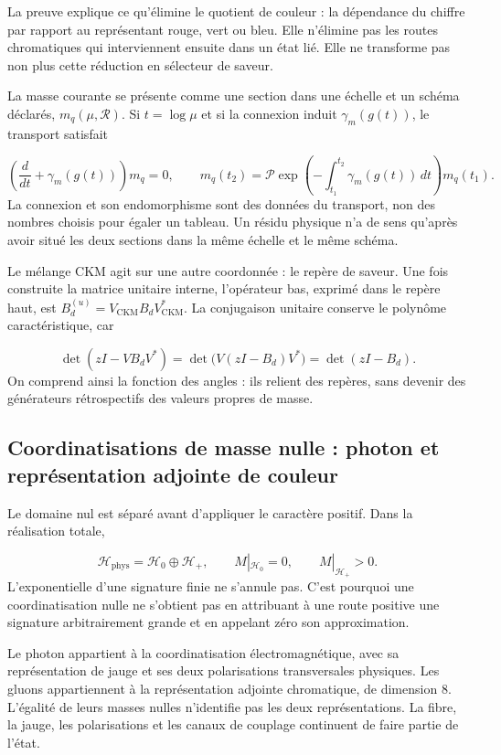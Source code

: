 La preuve explique ce qu’élimine le quotient de couleur : la dépendance du
chiffre par rapport au représentant rouge, vert ou bleu. Elle n’élimine pas les
routes chromatiques qui interviennent ensuite dans un état lié. Elle ne
transforme pas non plus cette réduction en sélecteur de saveur.


La masse courante se présente comme une section dans une échelle et un schéma
déclarés, \(m_q(\mu,\mathscr R)\). Si \(t=\log\mu\) et si la connexion
induit \(\gamma_m(g(t))\), le transport satisfait

\[
 \left(\frac{d}{dt}+\gamma_m(g(t))\right)m_q=0,
 \qquad
 m_q(t_2)=\mathcal P\exp\left(-\int_{t_1}^{t_2}
 \gamma_m(g(t))\,dt\right)m_q(t_1).
\]
La connexion et son endomorphisme sont des données du transport, non des nombres
choisis pour égaler un tableau. Un résidu physique n’a de sens
qu’après avoir situé les deux sections dans la même échelle et le même schéma.


Le mélange CKM agit sur une autre coordonnée : le repère de saveur. Une fois
construite la matrice unitaire interne, l’opérateur bas, exprimé dans
le repère haut, est \(B_d^{(u)}=V_{\mathrm{CKM}}B_dV_{\mathrm{CKM}}^*\).
La conjugaison unitaire conserve le polynôme caractéristique, car

\[
 \det(zI-VB_dV^*)=\det\bigl(V(zI-B_d)V^*\bigr)=\det(zI-B_d).
\]
On comprend ainsi la fonction des angles : ils relient des repères, sans
devenir des générateurs rétrospectifs des valeurs propres de masse.


\subsection{Coordinatisations de masse nulle : photon et représentation adjointe de couleur
}
\label{vi:subsec:nulo-familias}

Le domaine nul est séparé avant d’appliquer le caractère positif. Dans la
réalisation totale,

\[
 \mathcal H_{\mathrm{phys}}=\mathcal H_0\oplus\mathcal H_+,
 \qquad M|_{\mathcal H_0}=0,\qquad M|_{\mathcal H_+}>0.
\]
L’exponentielle d’une signature finie ne s’annule pas. C’est pourquoi une coordinatisation nulle
ne s’obtient pas en attribuant à une route positive une signature arbitrairement
grande et en appelant zéro son approximation.


Le photon appartient à la coordinatisation électromagnétique, avec sa représentation
de jauge et ses deux polarisations transversales physiques. Les gluons
appartiennent à la représentation adjointe chromatique, de dimension \(8\).
L’égalité de leurs masses nulles n’identifie pas les deux représentations.
La fibre, la jauge, les polarisations et les canaux de couplage
continuent de faire partie de l’état.


